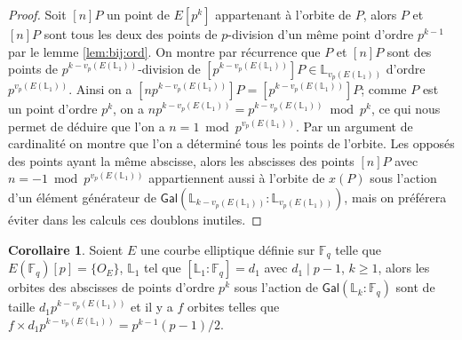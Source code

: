 \documentclass[10pt,a4paper]{book}
\theoremstyle{plain}
\theoremstyle{definition}
\theoremstyle{definition}
\theoremstyle{definition}
\newtheorem{cor}[thm]{Corollaire}
\theoremstyle{definition}
\theoremstyle{definition}
\theoremstyle{remark}
\theoremstyle{remark}
\theoremstyle{definition}
\begin{document}
\begin{proof}
Soit $[n]P$ un point de $E[p^k]$ appartenant à l'orbite de $P$, alors $P$ et 
$[n]P$ sont tous les deux des points de $p$-division d'un même point d'ordre 
$p^{k-1}$ par le lemme \ref{lem:bij:ord}. On montre par récurrence que $P$ et 
$[n]P$ sont des points de $p^{k-v_p({E(\mathbb{L}_1)})}$-division de 
$[p^{k-v_p({E(\mathbb{L}_1)})}]P \in \mathbb{L}_{v_p({E(\mathbb{L}_1)})}$ 
d'ordre $p^{v_p(E(\mathbb{L}_1))}$. Ainsi on a $[np^{k-v_p(E(\mathbb{L}_1))}]P=
[p^{k-v_p(E(\mathbb{L}_1))}]P$; comme $P$ est un point d'ordre $p^k$, on a 
$np^{k-v_p(E(\mathbb{L}_1))}=p^{k-v_p(E(\mathbb{L}_1))} \bmod p^k$, ce qui nous 
permet de déduire que l'on a $n=1 \bmod p^{v_p(E(\mathbb{L}_1))}$. Par un 
argument de cardinalité on montre que l'on a déterminé tous les points de 
l'orbite. Les opposés des points ayant la même abscisse, alors les abscisses 
des points $[n]P$ avec $n=-1 \bmod p^{v_p(E(\mathbb{L}_1))}$ appartiennent 
aussi à l'orbite de $x(P)$ sous l'action d'un élément générateur de 
$\mathsf{Gal}(\mathbb{L}_{k-v_p(E(\mathbb{L}_1))}:
\mathbb{L}_{v_p(E(\mathbb{L}_1))})$, mais on préférera éviter dans les calculs 
ces doublons inutiles.
\end{proof}

\begin{cor}
\label{cor:orb:fro} 
Soient $E$ une courbe elliptique définie sur $\mathbb{F}_q$ telle que \newline
$E(\mathbb{F}_q)[p] =\{O_E\} $, $\mathbb{L}_1$ tel que $[\mathbb{L}_1:
\mathbb{F}_q]=d_1$ avec $d_1 \mid p-1$, $k \geqslant 1$, alors les orbites des 
abscisses de points d'ordre $p^k$ sous l'action de $\mathsf{Gal}
(\mathbb{L}_{k}:\mathbb{F}_q)$ sont de taille $d_1 p^{k-v_p(E(\mathbb{L}_1))}$ 
et il y a $f$ orbites telles que $f \times d_1 p^{k-v_p(E(\mathbb{L}_1))} = 
p^{k-1}(p-1)/2$.
\end{cor}

\end{document}
